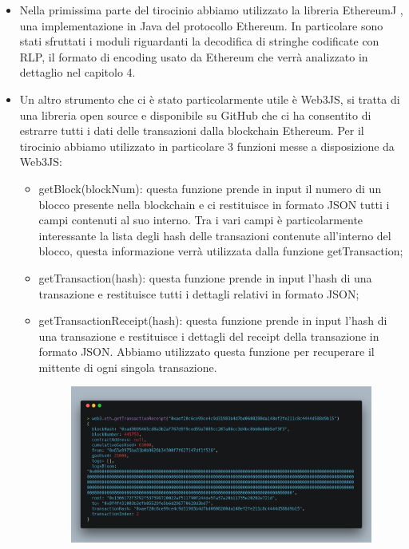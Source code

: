 \documentclass[12pt]{report}
\begin{document}
\begin{itemize}
    \item Nella primissima parte del tirocinio abbiamo utilizzato la libreria EthereumJ \cite{EthereumJ}, una implementazione in Java del protocollo Ethereum. In particolare sono stati sfruttati i moduli riguardanti la decodifica di stringhe codificate con RLP, il formato di encoding usato da Ethereum che verrà analizzato in dettaglio nel capitolo 4.
    \item Un altro strumento che ci è stato particolarmente utile è Web3JS, si tratta di una libreria open source e disponibile su GitHub \cite{Web3JS} che ci ha consentito di estrarre tutti i dati delle transazioni dalla blockchain Ethereum.\newline
    Per il tirocinio abbiamo utilizzato in particolare 3 funzioni messe a disposizione da Web3JS:
        \begin{itemize}
            \item getBlock(blockNum): questa funzione prende in input il numero di un blocco presente nella blockchain e ci restituisce in formato JSON tutti i campi contenuti al suo interno. Tra i vari campi è particolarmente interessante la lista degli hash delle transazioni contenute all'interno del blocco, questa informazione verrà utilizzata dalla funzione getTransaction;
            \item getTransaction(hash): questa funzione prende in input l'hash di una transazione e restituisce tutti i dettagli relativi in formato JSON;
            \item getTransactionReceipt(hash): questa funzione prende in input l'hash di una transazione e restituisce i dettagli del receipt della transazione in formato JSON. Abbiamo utilizzato questa funzione per recuperare il mittente di ogni singola transazione.
            \begin{figure}[H]
                \includegraphics[width=\textwidth]{carbon-10}

\end{figure}
\end{itemize}
\end{itemize}
\end{document}
